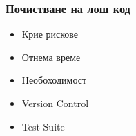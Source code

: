 \begin{frame}
  \frametitle{Почистване на лош код}
  \begin{minipage}[t]{0.48\linewidth}
    \begin{itemize}
        \item Крие рискове
        \item Отнема време
        \item Необоходимост
    \end{itemize}
  \end{minipage}\hfill
  \begin{minipage}[t]{0.48\linewidth}
      \begin{itemize}
          \item Version Control
          \item Test Suite
      \end{itemize}
  \end{minipage}
\end{frame}









